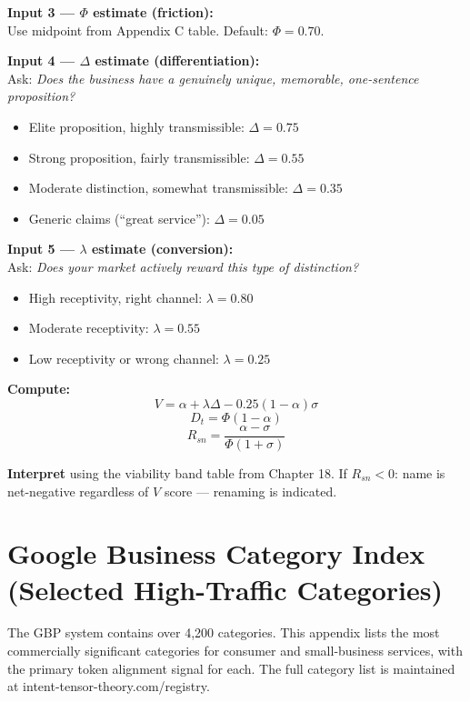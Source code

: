 \documentclass[12pt, openany]{book}
\theoremstyle{thmstyle}
\theoremstyle{defstyle}
\begin{document}
\textbf{Input 3 --- $\Phi$ estimate (friction):}\\
Use midpoint from Appendix C table. Default: $\Phi = 0.70$.

\textbf{Input 4 --- $\Delta$ estimate (differentiation):}\\
Ask: \textit{Does the business have a genuinely unique, memorable, one-sentence proposition?}
\begin{itemize}[leftmargin=1.5em, topsep=2pt]
  \item Elite proposition, highly transmissible: $\Delta = 0.75$
  \item Strong proposition, fairly transmissible: $\Delta = 0.55$
  \item Moderate distinction, somewhat transmissible: $\Delta = 0.35$
  \item Generic claims (``great service''): $\Delta = 0.05$
\end{itemize}

\textbf{Input 5 --- $\lambda$ estimate (conversion):}\\
Ask: \textit{Does your market actively reward this type of distinction?}
\begin{itemize}[leftmargin=1.5em, topsep=2pt]
  \item High receptivity, right channel: $\lambda = 0.80$
  \item Moderate receptivity: $\lambda = 0.55$
  \item Low receptivity or wrong channel: $\lambda = 0.25$
\end{itemize}

\textbf{Compute:}
\[
V = \alpha + \lambda\Delta - 0.25(1-\alpha)\sigma
\]
\[
D_t = \Phi(1-\alpha)
\]
\[
R_{sn} = \frac{\alpha - \sigma}{\Phi(1+\sigma)}
\]

\textbf{Interpret} using the viability band table from Chapter 18. If $R_{sn} < 0$: name is net-negative regardless of $V$ score --- renaming is indicated.

\chapter{Google Business Category Index (Selected High-Traffic Categories)}

\begin{appbox}[Purpose]
The GBP system contains over 4,200 categories. This appendix lists the most commercially significant categories for consumer and small-business services, with the primary token alignment signal for each. The full category list is maintained at intent-tensor-theory.com/registry.
\end{appbox}
\end{document}
